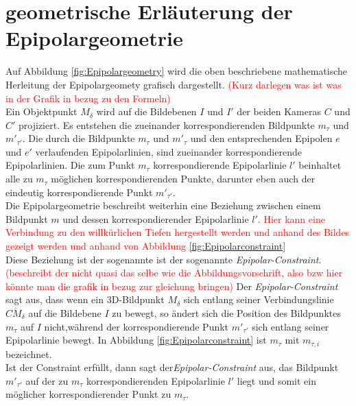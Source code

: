 \section{geometrische Erläuterung der Epipolargeometrie}
\label{sec:epipolar} 


Auf Abbildung \ref{fig:Epipolargeometry} wird die oben beschriebene mathematische Herleitung der Epipolargeomety grafisch dargestellt.  \textcolor{red}{(Kurz darlegen was ist was in der Grafik in bezug zu den Formeln)}\\

Ein Objektpunkt $M_\delta$ wird auf die Bildebenen $I$ und $I'$ der beiden Kameras $C$ und $C'$ projiziert. Es entstehen die zueinander korrespondierenden Bildpunkte $m_\tau$ und $m'_{\tau'}$. Die durch die Bildpunkte $m_\tau$ und $m'_{\tau}$ und den entsprechenden Epipolen $e$ und $e'$ verlaufenden Epipolarlinien, sind zueinander korrespondierende Epipolarlinien. Die zum Punkt $m_\tau$ korrespondierende Epipolarlinie $l'$ beinhaltet alle zu $m_\tau$ möglichen korrespondierenden Punkte, darunter eben auch der eindeutig korrespondierende Punkt $m'_{\tau'}$.\\

 Die Epipolargeometrie beschreibt weiterhin eine Beziehung zwischen einem Bildpunkt $m$ und dessen korrespondierender Epipolarlinie $l'$. \textcolor{red}{Hier kann eine Verbindung zu den willkürlichen Tiefen hergestellt werden und anhand des Bildes gezeigt werden und anhand von Abbildung \ref{fig:Epipolarconstraint}} \\
 
Diese Beziehung ist der sogenannte ist der sogenannte \textit{Epipolar-Constraint}\cite{HZ,Zhang2014,ZZGXr}.  \textcolor{red}{(beschreibt der nicht quasi das selbe wie die Abbildungsvorschrift, also bzw hier könnte man die grafik in bezug zur gleichung bringen)}
Der \textit{Epipolar-Constraint} sagt aus, dass wenn ein 3D-Bildpunkt $M_\delta$ sich entlang seiner Verbindungslinie $\overline{CM_\delta}$ auf die Bildebene $I$ zu bewegt, so ändert sich die Position des Bildpunktes $m_\tau$ auf $I$ nicht,während der korrespondierende Punkt $m'_{\tau'}$ sich entlang seiner Epipolarlinie bewegt. In Abbildung \ref{fig:Epipolarconstraint} ist $m_\tau$ mit $m_{\tau,i}$ bezeichnet. \\
Ist der Constraint erfüllt, dann sagt der\textit{Epipolar-Constraint} aus, das Bildpunkt  $m'_{\tau'}$ auf der zu $m_\tau$ korrespondierenden Epipolarlinie $l'$ liegt und somit ein möglicher korrespondierender Punkt zu $m_\tau$\cite{HZ,Zhang2014,Elements,ZZGXr}.\\


